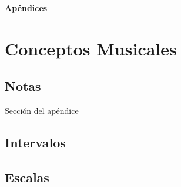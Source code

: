 \documentclass[12pt,twoside,titlepage]{report}
\begin{document}

\appendix
{}
{}
\mbox{}
\vfill
\begin{center}
\begin{Huge}
\textbf{Apéndices}
\end{Huge}
\end{center}
\vfill
\mbox{}
\thispagestyle{empty}
\newpage
\mbox{}
\thispagestyle{empty}
\newpage

\chapter{Conceptos Musicales}
\label{sec:apendice}

\section{Notas}

Sección del apéndice

\section{Intervalos}
\section{Escalas}






\end{document}
